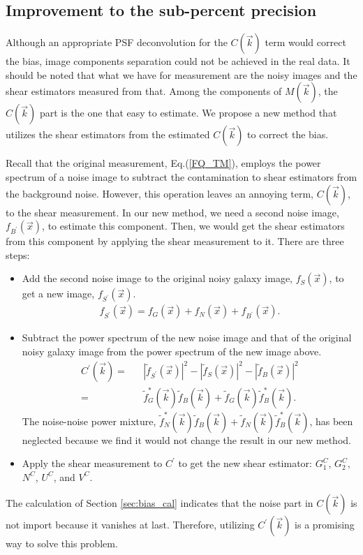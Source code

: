 \documentclass[twocolumn]{aastex62}
\begin{document}
\subsection{Improvement to the sub-percent precision}\label{sec:improve}
Although an appropriate PSF deconvolution for the $C(\vec{k})$ term would correct the bias, image components separation could not be achieved in the real data. It should be noted that what we have for measurement are the noisy images and the shear estimators measured from that. Among the components of $M(\vec{k})$, the $C(\vec{k})$ part is the one that easy to estimate. We propose a new method that utilizes the shear estimators from the estimated $C(\vec{k})$ to correct the bias. 

Recall that the original measurement, Eq.(\ref{FQ_TM}), employs the power spectrum of a noise image to subtract the contamination to shear estimators from the background noise. However, this operation leaves an annoying term, $C(\vec{k})$, to the shear measurement. In our new method, we need a second noise image, $f_{B^{\prime}}(\vec{x})$, to estimate this component. Then, we would get the shear estimators from this component by applying the shear measurement to it. There are three steps:
\begin{itemize}
	\item Add the second noise image to the original noisy galaxy image, $f_S(\vec{x})$, to get a new image, $f_{S^{\prime}}(\vec{x})$.
	\begin{eqnarray}
	f_{S^{\prime}}(\vec{x}) = f_G(\vec{x}) + f_N(\vec{x}) + f_{B^{\prime}}(\vec{x}).
	\end{eqnarray}
	
	\item Subtract the power spectrum of the new noise image and that of the original noisy galaxy image from the power spectrum of the new image above.
	\begin{eqnarray}
	C^{\prime}(\vec{k})=&&\left\vert \widetilde{f}_{S^{\prime}}(\vec{x})\right\vert^2 - \left\vert \widetilde{f}_{S}(\vec{x})\right\vert^2 - \left\vert \widetilde{f}_{B}(\vec{x})\right\vert^2 \\ \nonumber
	 =&& \widetilde{f}_{G}^{*}(\vec{k})\widetilde{f}_B(\vec{k}) + \widetilde{f}_{G}(\vec{k})\widetilde{f}_{B}^{*}(\vec{k}).
	\end{eqnarray}
	The noise-noise power mixture, $\widetilde{f}_{N}^{*}(\vec{k})\widetilde{f}_B(\vec{k}) + \widetilde{f}_{N}(\vec{k})\widetilde{f}_{B}^{*}(\vec{k})$, has been neglected because we find it would not change the result in our new method.
	
	\item Apply the shear measurement to $C^{\prime}$ to get the new shear estimator: $G_1^C$, $G_2^C$, $N^C$, $U^C$, and $V^C$.

\end{itemize}
The calculation of Section \ref{sec:bias_cal} indicates that the noise part in $C(\vec{k})$ is not import because it vanishes at last. Therefore, utilizing $C^{\prime}(\vec{k})$ is a promising way to solve this problem. 
\end{document}
